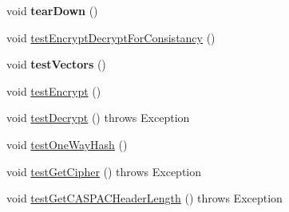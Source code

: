 \begin{DoxyCompactItemize}
\item 
\hypertarget{class_c_a_s_u_a_l_1_1crypto_1_1_a_e_s128_handler_test_ab84b3869bceb7cc35617c90529c21f7e}{void {\bfseries tear\-Down} ()}\label{class_c_a_s_u_a_l_1_1crypto_1_1_a_e_s128_handler_test_ab84b3869bceb7cc35617c90529c21f7e}

\item 
void \hyperlink{class_c_a_s_u_a_l_1_1crypto_1_1_a_e_s128_handler_test_a73233834a3d1d94d9b09e8497c908d53}{test\-Encrypt\-Decrypt\-For\-Consistancy} ()
\item 
\hypertarget{class_c_a_s_u_a_l_1_1crypto_1_1_a_e_s128_handler_test_af89670b934aadb3d920945c3642002a2}{void {\bfseries test\-Vectors} ()}\label{class_c_a_s_u_a_l_1_1crypto_1_1_a_e_s128_handler_test_af89670b934aadb3d920945c3642002a2}

\item 
void \hyperlink{class_c_a_s_u_a_l_1_1crypto_1_1_a_e_s128_handler_test_a7e236edcae27999247ca0d8917c3ba67}{test\-Encrypt} ()
\item 
void \hyperlink{class_c_a_s_u_a_l_1_1crypto_1_1_a_e_s128_handler_test_a388ea85acdd8e0e7f89bae2f41825754}{test\-Decrypt} ()  throws Exception 
\item 
void \hyperlink{class_c_a_s_u_a_l_1_1crypto_1_1_a_e_s128_handler_test_a7f52bdaa3a3480152bf09d623f0b3ef7}{test\-One\-Way\-Hash} ()
\item 
void \hyperlink{class_c_a_s_u_a_l_1_1crypto_1_1_a_e_s128_handler_test_add6d05ba482fa72052b9a8a2ddda9e1f}{test\-Get\-Cipher} ()  throws Exception 
\item 
void \hyperlink{class_c_a_s_u_a_l_1_1crypto_1_1_a_e_s128_handler_test_ab15c6d7c958dc99906168f6434cd4bc4}{test\-Get\-C\-A\-S\-P\-A\-C\-Header\-Length} ()  throws Exception 
\end{DoxyCompactItemize}
